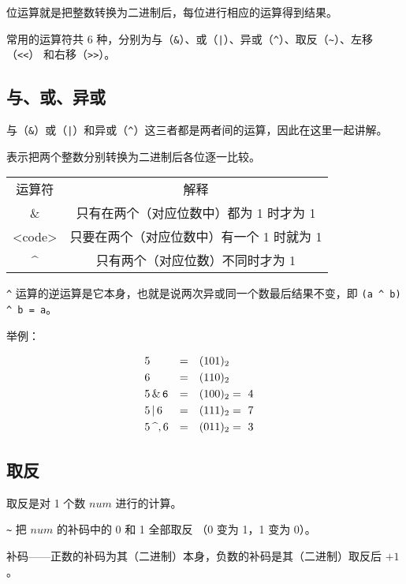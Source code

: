 
位运算就是把整数转换为二进制后，每位进行相应的运算得到结果。

常用的运算符共 6 种，分别为与（\texttt{\&}）、或（\texttt{|}）、异或（\texttt{\textasciicircum{}}）、取反（\texttt{\textasciitilde{}}）、左移（\texttt{<<}） 和右移（\texttt{>>}）。

\subsection{与、或、异或}

与（\texttt{\&}）或（\texttt{|}）和异或（\texttt{\textasciicircum{}}）这三者都是两者间的运算，因此在这里一起讲解。

表示把两个整数分别转换为二进制后各位逐一比较。

\begin{tabular}{cc}
\hline
运算符& 解释\\\&& 只有在两个（对应位数中）都为 1 时才为 1\\<code>& 只要在两个（对应位数中）有一个 1 时就为 1\\\textasciicircum{}& 只有两个（对应位数）不同时才为 1\\\hline
\end{tabular}

\texttt{\textasciicircum{}} 运算的逆运算是它本身，也就是说两次异或同一个数最后结果不变，即 \texttt{(a \textasciicircum{} b) \textasciicircum{} b = a}。

\begin{QUOTE}{}{}
举例：

$$
\begin{aligned}
&5&=&&(101)_2\\
&6&=&&(110)_2\\
&5\tt\,\&\,6\rm&=&&(100)_2&=\ 4\\
&5\tt\,|\,\rm6&=&&(111)_2&=\ 7\\
&5\tt\,\mbox{\textasciicircum},\rm6&=&&(011)_2&=\ 3\\
\end{aligned}
$$
\end{QUOTE}

\subsection{取反}

取反是对 1 个数 $num$ 进行的计算。

\texttt{\textasciitilde{}} 把 $num$ 的补码中的 0 和 1 全部取反 （0 变为 1，1 变为 0）。

补码——正数的补码为其（二进制）本身，负数的补码是其（二进制）取反后 $+1$。

